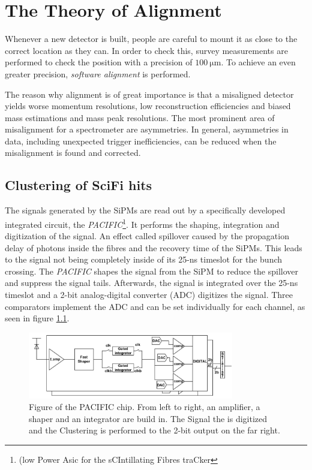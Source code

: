 \chapter{The Theory of Alignment}
\label{sec:alignTheory}

Whenever a new detector is built, people are careful to mount it as close to the correct location as they can. In order to check this, survey measurements are
performed to check the position with a precision of $\SI{100}{\micro\metre}$.
To achieve an even greater precision, \textit{software alignment} is performed.

The reason why alignment is of great importance is that a misaligned detector
yields worse momentum resolutions, low reconstruction efficiencies and biased mass estimations and mass peak resolutions.
The most prominent area of misalignment for a spectrometer are asymmetries.
In general, asymmetries in data, including unexpected trigger inefficiencies, can be reduced when the misalignment is found and corrected.

\section{Clustering of SciFi hits}
\label{sec:clustering}

The signals generated by the SiPMs are read out by a specifically developed integrated circuit, the \textit{PACIFIC}\footnote{(low Power Asic for the sCIntillating Fibres traCker}\cite{readout}.
It performs the shaping, integration and digitization of the signal. An effect called spillover caused by the propagation delay of photons inside the fibres and the recovery time of the SiPMs. This leads to the signal not being completely inside of its 25-ns timeslot for the bunch crossing. The \textit{PACIFIC} shapes the signal from the SiPM to reduce the spillover and suppress the signal tails\cite{techreport}. Afterwards, the signal is integrated over the 25-ns timeslot and a 2-bit analog-digital converter (ADC) digitizes the signal.
Three comparators implement the ADC and can be set individually for each channel, as seen in figure \ref{fig:pac}.

\begin{figure}
    \centering
    \includegraphics[width=0.8\textwidth]{plots/pacific.png}
    \caption{Figure of the PACIFIC chip. From left to right, an amplifier, a shaper and an integrator are build in. The Signal the is digitized and the Clustering is performed to the 2-bit output on the far right.}
    \label{fig:pac}
\end{figure}

